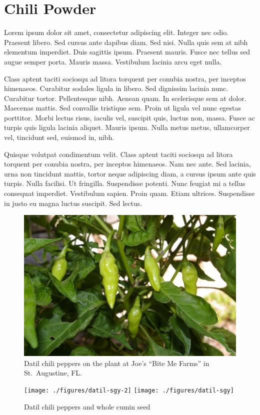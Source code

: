\documentclass[12pt, final]{book}
\begin{document}
\chapter{Chili Powder}
Lorem ipsum dolor sit amet, consectetur adipiscing elit. Integer nec odio. Praesent libero. Sed cursus ante dapibus diam. Sed nisi. Nulla quis sem at nibh elementum imperdiet. Duis sagittis ipsum. Praesent mauris. Fusce nec tellus sed augue semper porta. Mauris massa. Vestibulum lacinia arcu eget nulla. 

Class aptent taciti sociosqu ad litora torquent per conubia nostra, per inceptos himenaeos. Curabitur sodales ligula in libero. Sed dignissim lacinia nunc. Curabitur tortor. Pellentesque nibh. Aenean quam. In scelerisque sem at dolor. Maecenas mattis. Sed convallis tristique sem. Proin ut ligula vel nunc egestas porttitor. Morbi lectus risus, iaculis vel, suscipit quis, luctus non, massa. Fusce ac turpis quis ligula lacinia aliquet. Mauris ipsum. Nulla metus metus, ullamcorper vel, tincidunt sed, euismod in, nibh. 

Quisque volutpat condimentum velit. Class aptent taciti sociosqu ad litora torquent per conubia nostra, per inceptos himenaeos. Nam nec ante. Sed lacinia, urna non tincidunt mattis, tortor neque adipiscing diam, a cursus ipsum ante quis turpis. Nulla facilisi. Ut fringilla. Suspendisse potenti. Nunc feugiat mi a tellus consequat imperdiet. Vestibulum sapien. Proin quam. Etiam ultrices. Suspendisse in justo eu magna luctus suscipit. Sed lectus. 
\clearpage
\begin{figure}
\begin{center}
\includegraphics[height=0.5\textwidth]{./figures/datil-bite-me}
\end{center}
\caption*{Datil chili peppers on the plant at Joe's ``Bite Me Farms'' in St.\ Augustine, FL.}
\end{figure}

\begin{figure}
\begin{center}
\texttt{[image: ./figures/datil-sgy-2]}
\texttt{[image: ./figures/datil-sgy]}
\end{center}
\caption*{Datil chili peppers and whole cumin seed}
\end{figure}

\clearpage

\clearpage

\newpage

\newpage

\newpage

\end{document}
